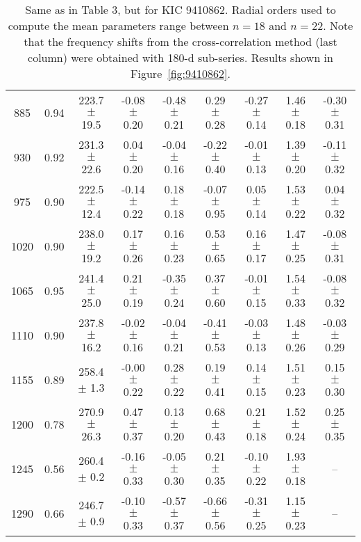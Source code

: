 \documentclass[twocolumn]{aastex61}%
\begin{document}
\begin{table*}[ht]
\begin{tabular}{ccc|ccccc|c}
885 & 0.94 & 223.7 $\pm$ 19.5 & -0.08 $\pm$ 0.20 & -0.48 $\pm$ 0.21 & 0.29 $\pm$ 0.28 & -0.27 $\pm$ 0.14 & 1.46 $\pm$ 0.18 & -0.30 $\pm$ 0.31\\
930 & 0.92 & 231.3 $\pm$ 22.6 & 0.04 $\pm$ 0.20 & -0.04 $\pm$ 0.16 & -0.22 $\pm$ 0.40 & -0.01 $\pm$ 0.13 & 1.39 $\pm$ 0.20 & -0.11 $\pm$ 0.32\\
975 & 0.90 & 222.5 $\pm$ 12.4 & -0.14 $\pm$ 0.22 & 0.18 $\pm$ 0.18 & -0.07 $\pm$ 0.95 & 0.05 $\pm$ 0.14 & 1.53 $\pm$ 0.22 & 0.04 $\pm$ 0.32\\
1020 & 0.90 & 238.0 $\pm$ 19.2 & 0.17 $\pm$ 0.26 & 0.16 $\pm$ 0.23 & 0.53 $\pm$ 0.65 & 0.16 $\pm$ 0.17 & 1.47 $\pm$ 0.25 & -0.08 $\pm$ 0.31\\
1065 & 0.95 & 241.4 $\pm$ 25.0 & 0.21 $\pm$ 0.19 & -0.35 $\pm$ 0.24 & 0.37 $\pm$ 0.60 & -0.01 $\pm$ 0.15 & 1.54 $\pm$ 0.33 & -0.08 $\pm$ 0.32\\
1110 & 0.90 & 237.8 $\pm$ 16.2 & -0.02 $\pm$ 0.16 & -0.04 $\pm$ 0.21 & -0.41 $\pm$ 0.53 & -0.03 $\pm$ 0.13 & 1.48 $\pm$ 0.26 & -0.03 $\pm$ 0.29\\
1155 & 0.89 & 258.4 $\pm$ 1.3 & -0.00 $\pm$ 0.22 & 0.28 $\pm$ 0.22 & 0.19 $\pm$ 0.41 & 0.14 $\pm$ 0.15 & 1.51 $\pm$ 0.23 & 0.15 $\pm$ 0.30\\
1200 & 0.78 & 270.9 $\pm$ 26.3 & 0.47 $\pm$ 0.37 & 0.13 $\pm$ 0.20 & 0.68 $\pm$ 0.43 & 0.21 $\pm$ 0.18 & 1.52 $\pm$ 0.24 & 0.25 $\pm$ 0.35\\
1245 & 0.56 & 260.4 $\pm$ 0.2 & -0.16 $\pm$ 0.33 & -0.05 $\pm$ 0.30 & 0.21 $\pm$ 0.35 & -0.10 $\pm$ 0.22 & 1.93 $\pm$ 0.18 & --\\
1290 & 0.66 & 246.7 $\pm$ 0.9 & -0.10 $\pm$ 0.33 & -0.57 $\pm$ 0.37 & -0.66 $\pm$ 0.56 & -0.31 $\pm$ 0.25 & 1.15 $\pm$ 0.23 & --\\
\end{tabular}
\caption{Same as in Table 3, but for KIC 9410862. {Radial orders used to compute the mean parameters range between $n=18$ and $n=22$.} Note that the frequency shifts from the cross-correlation method (last column) were obtained with 180-d sub-series. Results shown in Figure~\ref{fig:9410862}.}\label{tab:9410862}
\end{table*}
\end{document}
